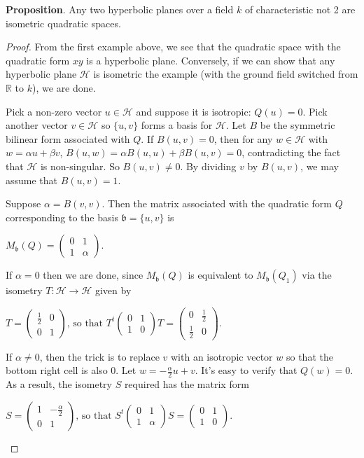 \documentclass[12pt]{article}
\begin{document}
\textbf{Proposition}.  Any two hyperbolic planes over a field $k$ of
characteristic not 2 are isometric quadratic spaces.
\begin{proof}  From the first example above, we see that the quadratic space with the quadratic form $xy$ is a hyperbolic plane.  Conversely, if we can show that any hyperbolic plane $\mathcal{H}$ is isometric the example (with the ground field switched from $\mathbb{R}$ to $k$), we are done.

Pick a non-zero vector $u\in\mathcal{H}$ and suppose it is
isotropic: $Q(u)=0$.  Pick another vector $v\in\mathcal{H}$ so
$\lbrace u,v\rbrace$ forms a basis for $\mathcal{H}$.  Let $B$ be
the symmetric bilinear form associated with $Q$.  If $B(u,v)=0$,
then for any $w\in\mathcal{H}$ with $w=\alpha u+\beta v$, $B(u,w)=
\alpha B(u,u)+\beta B(u,v)=0$, contradicting the fact that
$\mathcal{H}$ is non-singular.  So $B(u,v)\neq 0$.  By dividing $v$
by $B(u,v)$, we may assume that $B(u,v)=1$.

Suppose $\alpha=B(v,v)$.  Then the matrix associated with the quadratic form $Q$ corresponding to the basis $\mathfrak{b}=\lbrace u,v\rbrace$ is  
\begin{center}$M_{\mathfrak{b}}(Q)=
\begin{pmatrix}
0 & 1 \\
1 & \alpha
\end{pmatrix}.$
\end{center}

If $\alpha=0$ then we are done, since $M_{\mathfrak{b}}(Q)$ is equivalent to $M_{\mathfrak{b}}(Q_1)$ via the isometry $T:\mathcal{H}\to\mathcal{H}$ given by 
\begin{center}$T=
\begin{pmatrix}
\frac{1}{2} & 0 \\
0 & 1
\end{pmatrix}\mbox{, so that }
T^t
\begin{pmatrix}
0 & 1 \\
1 & 0
\end{pmatrix}T=
\begin{pmatrix}
0 & \frac{1}{2} \\
\frac{1}{2} & 0
\end{pmatrix}.$
\end{center}

If $\alpha\neq 0$, then the trick is to replace $v$ with an isotropic vector $w$ so that the bottom right cell is also 0.  Let $w=-\frac{\alpha}{2}u+v$.  It's easy to verify that $Q(w)=0$.  As a result, the isometry $S$ required has the matrix form
\begin{center}$S=
\begin{pmatrix}
1 & -\frac{\alpha}{2} \\
0 & 1
\end{pmatrix}\mbox{, so that }
S^t
\begin{pmatrix}
0 & 1 \\
1 & \alpha
\end{pmatrix}S=
\begin{pmatrix}
0 & 1 \\
1 & 0
\end{pmatrix}.$
\end{center}
\end{proof}
\end{document}
